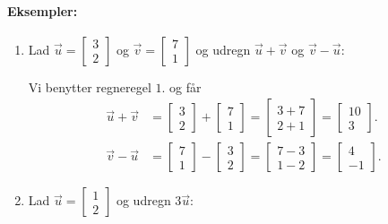\paragraph*{Eksempler:}
\begin{enumerate}
\item Lad $\vec{u}= \begin{bmatrix} 3 \\ 2 \end{bmatrix}$ og $\vec{v}= \begin{bmatrix} 7 \\ 1 \end{bmatrix}$ og udregn $\vec{u}+\vec{v}$ og $\vec{v}-\vec{u}$:

Vi benytter regneregel $1$. og får
\begin{align*}
\vec{u} + \vec{v}&= \begin{bmatrix} 3 \\ 2 \end{bmatrix} + \begin{bmatrix} 7 \\ 1 \end{bmatrix} = \begin{bmatrix} 3+7 \\ 2+1 \end{bmatrix}  = \begin{bmatrix} 10 \\ 3 \end{bmatrix}. \\
\vec{v} - \vec{u}&= \begin{bmatrix} 7 \\ 1 \end{bmatrix} - \begin{bmatrix} 3 \\ 2 \end{bmatrix} = \begin{bmatrix} 7-3 \\ 1-2 \end{bmatrix}  = \begin{bmatrix} 4 \\ -1 \end{bmatrix}.
\end{align*}
\item Lad $\vec{u}= \begin{bmatrix} 1 \\ 2 \end{bmatrix}$ og udregn $3\vec{u}$:


\end{enumerate}
